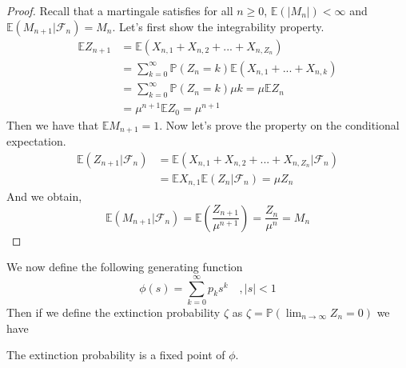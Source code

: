 \begin{proof}
	Recall that a martingale satisfies for all $n\geq0$, $\mathbb{E}(|M_n|) < \infty$ and $\mathbb{E}(M_{n+1} | \mathcal{F}_n) = M_n$.
	Let's first show the integrability property.
	\begin{align}
		\mathbb{E}Z_{n+1} 	&= \mathbb{E}(X_{n,1} + X_{n,2} + ... + X_{n, Z_n}) \\
					&= \sum_{k=0}^{\infty} \mathbb{P}(Z_n = k)\mathbb{E}(X_{n,1} + ... + X_{n,k})\\
					&= \sum_{k=0}^{\infty} \mathbb{P}(Z_n = k) \mu k = \mu \mathbb{E}Z_n \\
					&= \mu ^{n+1} \mathbb{E} Z_0 = \mu^{n+1}
	\end{align}
	Then we have that $\mathbb{E}M_{n+1} = 1$.
	\newline
	Now let's prove the property on the conditional expectation.
	\begin{align}
		\mathbb{E}(Z_{n+1} | \mathcal{F}_n) 	&= \mathbb{E}( X_{n,1} + X_{n,2} + ... + X_{n, Z_n} | \mathcal{F}_n ) \\
							&= \mathbb{E}X_{n, 1} \mathbb{E}(Z_n |\mathcal{F}_n ) = \mu Z_n
	\end{align}
	And we obtain,
	\begin{equation}
		\mathbb{E}(M_{n+1} | \mathcal{F}_n) = \mathbb{E}(\frac{Z_{n+1}}{\mu^{n+1}}) = \frac{Z_n}{\mu^n} = M_n
	\end{equation}
\end{proof}
We now define the following generating function
\begin{equation}
	\phi(s) = \sum_{k=0}^{\infty} p_k s^k \quad , |s| <1
\end{equation}
Then if we define the extinction probability $\zeta$ as $\zeta = \mathbb{P}(\lim_{n \to \infty} Z_n = 0)$
we have
\begin{theorem}\label{th:ProbExtinction}
	The extinction probability is a fixed point of $\phi$.
\end{theorem}
